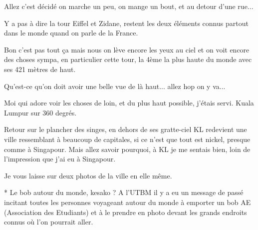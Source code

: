 \begin{multicols}{2}
Allez c'est décidé on marche un peu, on mange un bout, et au detour d'une rue...


Y a pas à dire la tour Eiffel et Zidane, restent les deux éléments connus partout dans le monde quand on parle de la France.

Bon c'est pas tout ça mais nous on lève encore les yeux au ciel et on voit encore des choses sympa, en particulier cette tour, la 4ème la plus haute du monde avec ses 421 mètres de haut.


Qu'est-ce qu'on doit avoir une belle vue de là haut... allez hop on y va...


Moi qui adore voir les choses de loin, et du plus haut possible, j'étais servi. Kuala Lumpur sur 360 degrés.

Retour sur le plancher des singes, en dehors de ses gratte-ciel KL redevient une ville ressemblant à beaucoup de capitales, si ce n'est que tout est nickel, presque comme à Singapour. Mais allez savoir pourquoi, à KL je me sentais bien, loin de l'impression que j'ai eu à Singapour.

Je vous laisse sur deux photos de la ville en elle même.



\end{multicols}

 * Le bob autour du monde, kesako ? A l'UTBM il y a eu un message de passé incitant toutes les personnes voyageant autour du monde à emporter un bob AE (Association des Etudiants) et à le prendre en photo devant les grands endroits connus où l'on pourrait aller.



